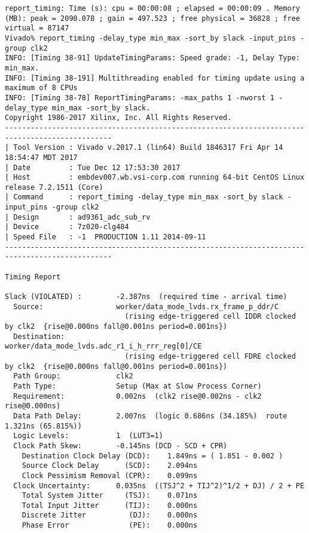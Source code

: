\documentclass{article}
\begin{document}
\begin{lstlisting}
report_timing: Time (s): cpu = 00:00:08 ; elapsed = 00:00:09 . Memory (MB): peak = 2090.078 ; gain = 497.523 ; free physical = 36828 ; free virtual = 87147
Vivado% report_timing -delay_type min_max -sort_by slack -input_pins -group clk2
INFO: [Timing 38-91] UpdateTimingParams: Speed grade: -1, Delay Type: min_max.
INFO: [Timing 38-191] Multithreading enabled for timing update using a maximum of 8 CPUs
INFO: [Timing 38-78] ReportTimingParams: -max_paths 1 -nworst 1 -delay_type min_max -sort_by slack.
Copyright 1986-2017 Xilinx, Inc. All Rights Reserved.
-----------------------------------------------------------------------------------------------
| Tool Version : Vivado v.2017.1 (lin64) Build 1846317 Fri Apr 14 18:54:47 MDT 2017
| Date         : Tue Dec 12 17:53:30 2017
| Host         : embdev007.wb.vsi-corp.com running 64-bit CentOS Linux release 7.2.1511 (Core)
| Command      : report_timing -delay_type min_max -sort_by slack -input_pins -group clk2
| Design       : ad9361_adc_sub_rv
| Device       : 7z020-clg484
| Speed File   : -1  PRODUCTION 1.11 2014-09-11
-----------------------------------------------------------------------------------------------

Timing Report

Slack (VIOLATED) :        -2.387ns  (required time - arrival time)
  Source:                 worker/data_mode_lvds.rx_frame_p_ddr/C
                            (rising edge-triggered cell IDDR clocked by clk2  {rise@0.000ns fall@0.001ns period=0.001ns})
  Destination:            worker/data_mode_lvds.adc_r1_i_h_rrr_reg[0]/CE
                            (rising edge-triggered cell FDRE clocked by clk2  {rise@0.000ns fall@0.001ns period=0.001ns})
  Path Group:             clk2
  Path Type:              Setup (Max at Slow Process Corner)
  Requirement:            0.002ns  (clk2 rise@0.002ns - clk2 rise@0.000ns)
  Data Path Delay:        2.007ns  (logic 0.686ns (34.185%)  route 1.321ns (65.815%))
  Logic Levels:           1  (LUT3=1)
  Clock Path Skew:        -0.145ns (DCD - SCD + CPR)
    Destination Clock Delay (DCD):    1.849ns = ( 1.851 - 0.002 ) 
    Source Clock Delay      (SCD):    2.094ns
    Clock Pessimism Removal (CPR):    0.099ns
  Clock Uncertainty:      0.035ns  ((TSJ^2 + TIJ^2)^1/2 + DJ) / 2 + PE
    Total System Jitter     (TSJ):    0.071ns
    Total Input Jitter      (TIJ):    0.000ns
    Discrete Jitter          (DJ):    0.000ns
    Phase Error              (PE):    0.000ns


\end{lstlisting}
\end{document}

